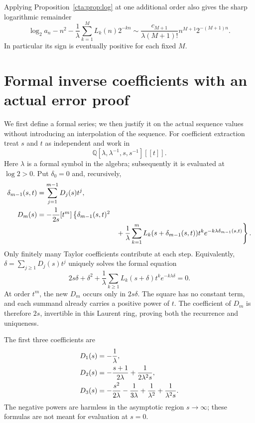 \documentclass[11pt]{article}
\theoremstyle{definition}
\theoremstyle{remark}
\newcommand{\la}{\lambda}
\begin{document}
Applying Proposition~\ref{cta:prop:log} at one additional order also gives
the sharp logarithmic remainder
\begin{equation}\label{cta:eq:logsharp}
 \log_2a_n-n^2-\frac1\la\sum_{k=1}^M L_k(n)2^{-kn}
 \sim\frac{c_{M+1}}{\la(M+1)!}n^{M+1}2^{-(M+1)n}.
\end{equation}
In particular its sign is eventually positive for each fixed $M$.

\section{Formal inverse coefficients with an actual error proof}\label{cta:sec:inverse}

We first define a formal series; we then justify it on the actual
sequence values without introducing an interpolation of the sequence.
For coefficient extraction treat $s$ and $t$ as independent and work in
\[
 \mathbb Q[\la,\la^{-1},s,s^{-1}][[t]].
\]
Here $\la$ is a formal symbol in the algebra; subsequently it is evaluated
at $\log2>0$. Put $\delta_0=0$ and, recursively,
\begin{align}
 \delta_{m-1}(s,t)&=\sum_{j=1}^{m-1}D_j(s)t^j,\notag\\
 D_m(s)&=-\frac{1}{2s}[t^m]\left\{
 \delta_{m-1}(s,t)^2\right.\label{cta:eq:Drec}\\[-2pt]
 &\hspace{39mm}\left.{}+\frac1\la\sum_{k=1}^m
 L_k(s+\delta_{m-1}(s,t))t^k
 e^{-k\la\delta_{m-1}(s,t)}\right\}.\notag
\end{align}
Only finitely many Taylor coefficients contribute at each step. Equivalently,
$\delta=\sum_{j\geq1}D_j(s)t^j$ uniquely solves the formal equation
\begin{equation}\label{cta:eq:formal-inverse}
 2s\delta+\delta^2+
 \frac1\la\sum_{k\geq1}L_k(s+\delta)t^ke^{-k\la\delta}=0.
\end{equation}
At order $t^m$, the new $D_m$ occurs only in $2s\delta$. The square has
no constant term, and each summand already carries a positive power of $t$.
The coefficient of $D_m$ is therefore $2s$, invertible in this Laurent
ring, proving both the recurrence and uniqueness.

The first three coefficients are
\begin{align}\label{cta:eq:firstD}
 D_1(s)&=-\frac1\la,\notag\\
 D_2(s)&=-\frac{s+1}{2\la}+\frac{1}{2\la^2s},\notag\\
 D_3(s)&=-\frac{s^2}{2\la}-\frac{1}{3\la}
                      +\frac1{\la^2}+\frac1{\la^2s}.
\end{align}
The negative powers are harmless in the asymptotic region $s\to\infty$;
these formulas are not meant for evaluation at $s=0$.
\end{document}
